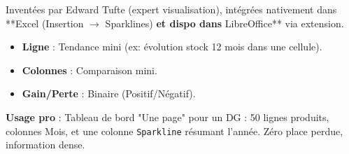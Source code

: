 \documentclass[11pt]{article}
\begin{document}
\begin{savaistu}
Inventées par Edward Tufte (expert visualisation), intégrées nativement dans **Excel (Insertion $\to$ Sparklines)\textbf{ et dispo dans }LibreOffice** via extension.
\begin{itemize}
    \item \textbf{Ligne} : Tendance mini (ex: évolution stock 12 mois dans une cellule).
    \item \textbf{Colonnes} : Comparaison mini.
    \item \textbf{Gain/Perte} : Binaire (Positif/Négatif).
\end{itemize}
\textbf{Usage pro} : Tableau de bord "Une page" pour un DG : 50 lignes produits, colonnes Mois, et une colonne \texttt{Sparkline} résumant l'année. Zéro place perdue, information dense.
\end{savaistu}
\end{document}
